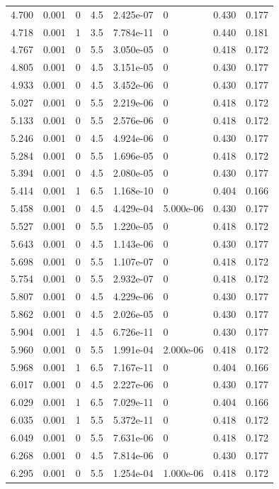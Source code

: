 \documentclass[preview]{standalone}
\begin{document}
{{{\begin{tabular}{L{1.2cm}C{1.2cm} C{0.3cm}C{0.5cm} C{1.4cm}C{1.4cm} C{1.4cm}C{1.4cm}}
  4.700  &  0.001  & 0     & 4.5 &  2.425e-07  & 0  & 0.430 &  0.177   \\ 
  4.718  &  0.001  & 1     & 3.5 &  7.784e-11  & 0  & 0.440 &  0.181   \\ 
  4.767  &  0.001  & 0     & 5.5 &  3.050e-05  & 0  & 0.418 &  0.172   \\ 
  4.805  &  0.001  & 0     & 4.5 &  3.151e-05  & 0  & 0.430 &  0.177   \\ 
  4.933  &  0.001  & 0     & 4.5 &  3.452e-06  & 0  & 0.430 &  0.177   \\ 
  5.027  &  0.001  & 0     & 5.5 &  2.219e-06  & 0  & 0.418 &  0.172   \\ 
  5.133  &  0.001  & 0     & 5.5 &  2.576e-06  & 0  & 0.418 &  0.172   \\ 
  5.246  &  0.001  & 0     & 4.5 &  4.924e-06  & 0  & 0.430 &  0.177   \\ 
  5.284  &  0.001  & 0     & 5.5 &  1.696e-05  & 0  & 0.418 &  0.172   \\ 
  5.394  &  0.001  & 0     & 4.5 &  2.080e-05  & 0  & 0.430 &  0.177   \\ 
  5.414  &  0.001  & 1     & 6.5 &  1.168e-10  & 0  & 0.404 &  0.166   \\ 
  5.458  &  0.001  & 0     & 4.5 &  4.429e-04  & 5.000e-06  & 0.430 &  0.177   \\ 
  5.527  &  0.001  & 0     & 5.5 &  1.220e-05  & 0  & 0.418 &  0.172   \\ 
  5.643  &  0.001  & 0     & 4.5 &  1.143e-06  & 0  & 0.430 &  0.177   \\ 
  5.698  &  0.001  & 0     & 5.5 &  1.107e-07  & 0  & 0.418 &  0.172   \\ 
  5.754  &  0.001  & 0     & 5.5 &  2.932e-07  & 0  & 0.418 &  0.172   \\ 
  5.807  &  0.001  & 0     & 4.5 &  4.229e-06  & 0  & 0.430 &  0.177   \\ 
  5.862  &  0.001  & 0     & 4.5 &  2.026e-05  & 0  & 0.430 &  0.177   \\ 
  5.904  &  0.001  & 1     & 4.5 &  6.726e-11  & 0  & 0.430 &  0.177   \\ 
  5.960  &  0.001  & 0     & 5.5 &  1.991e-04  & 2.000e-06  & 0.418 &  0.172   \\ 
  5.968  &  0.001  & 1     & 6.5 &  7.167e-11  & 0  & 0.404 &  0.166   \\ 
  6.017  &  0.001  & 0     & 4.5 &  2.227e-06  & 0  & 0.430 &  0.177   \\ 
  6.029  &  0.001  & 1     & 6.5 &  7.029e-11  & 0  & 0.404 &  0.166   \\ 
  6.035  &  0.001  & 1     & 5.5 &  5.372e-11  & 0  & 0.418 &  0.172   \\ 
  6.049  &  0.001  & 0     & 5.5 &  7.631e-06  & 0  & 0.418 &  0.172   \\ 
  6.268  &  0.001  & 0     & 4.5 &  7.814e-06  & 0  & 0.430 &  0.177   \\ 
  6.295  &  0.001  & 0     & 5.5 &  1.254e-04  & 1.000e-06  & 0.418 &  0.172   \\ 
\hline 
\end{tabular} 

}}}
\end{document}
